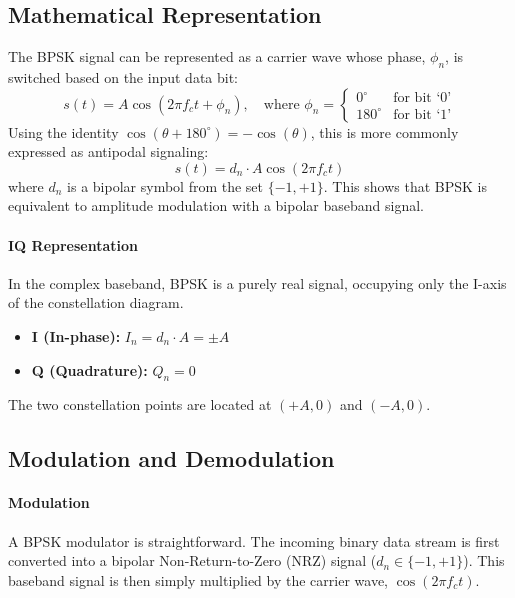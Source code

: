 \subsection{Mathematical Representation}

The BPSK signal can be represented as a carrier wave whose phase, $\phi_n$, is switched based on the input data bit:
\begin{equation}
    s(t) = A \cos(2\pi f_c t + \phi_n), \quad \text{where } \phi_n = \begin{cases} 0^\circ & \text{for bit `0'} \\ 180^\circ & \text{for bit `1'} \end{cases}
\end{equation}
Using the identity $\cos(\theta + 180^\circ) = -\cos(\theta)$, this is more commonly expressed as antipodal signaling:
\begin{equation}
    s(t) = d_n \cdot A \cos(2\pi f_c t)
\end{equation}
where $d_n$ is a bipolar symbol from the set $\{-1, +1\}$. This shows that BPSK is equivalent to amplitude modulation with a bipolar baseband signal.

\paragraph{IQ Representation}
In the complex baseband, BPSK is a purely real signal, occupying only the I-axis of the constellation diagram.
\begin{itemize}
    \item \textbf{I (In-phase):} $I_n = d_n \cdot A = \pm A$
    \item \textbf{Q (Quadrature):} $Q_n = 0$
\end{itemize}
The two constellation points are located at $(+A, 0)$ and $(-A, 0)$.


\subsection{Modulation and Demodulation}

\paragraph{Modulation}
A BPSK modulator is straightforward. The incoming binary data stream is first converted into a bipolar Non-Return-to-Zero (NRZ) signal ($d_n \in \{-1, +1\}$). This baseband signal is then simply multiplied by the carrier wave, $\cos(2\pi f_c t)$.


